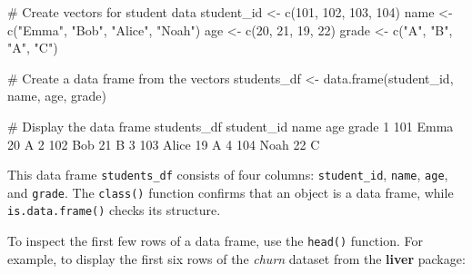\documentclass[
  11pt,
]{book}
\makeatletter
\newenvironment{Shaded}{}{}
\newcommand{\CommentTok}[1]{\textcolor[rgb]{0.36,0.36,0.36}{#1}}
\newcommand{\DecValTok}[1]{#1}
\newcommand{\FunctionTok}[1]{#1}
\newcommand{\NormalTok}[1]{#1}
\newcommand{\OtherTok}[1]{\textcolor[rgb]{0.39,0.39,0.39}{#1}}
\newcommand{\StringTok}[1]{\textcolor[rgb]{0.39,0.39,0.39}{#1}}
\newenvironment{kframe}{%
\medskip{}
\setlength{\fboxsep}{.8em}
 \def\at@end@of@kframe{}%
 \ifinner\ifhmode%
  \def\at@end@of@kframe{\end{minipage}}%
  \begin{minipage}{\columnwidth}%
 \fi\fi%
 \def\FrameCommand##1{\hskip\@totalleftmargin \hskip-\fboxsep
 \colorbox{shadecolor}{##1}\hskip-\fboxsep
     \hskip-\linewidth \hskip-\@totalleftmargin \hskip\columnwidth}%
 \MakeFramed {\advance\hsize-\width
   \@totalleftmargin\z@ \linewidth\hsize
   \@setminipage}}%
 {\par\unskip\endMakeFramed%
 \at@end@of@kframe}
\renewenvironment{Shaded}{\begin{kframe}}{\end{kframe}}
\theoremstyle{definition}
\theoremstyle{definition}
\theoremstyle{definition}
\theoremstyle{definition}
\theoremstyle{remark}
\makeatother
\begin{document}
\begin{Shaded}
\begin{Highlighting}[]
\CommentTok{\# Create vectors for student data}
\NormalTok{student\_id }\OtherTok{\textless{}{-}} \FunctionTok{c}\NormalTok{(}\DecValTok{101}\NormalTok{, }\DecValTok{102}\NormalTok{, }\DecValTok{103}\NormalTok{, }\DecValTok{104}\NormalTok{)}
\NormalTok{name       }\OtherTok{\textless{}{-}} \FunctionTok{c}\NormalTok{(}\StringTok{"Emma"}\NormalTok{, }\StringTok{"Bob"}\NormalTok{, }\StringTok{"Alice"}\NormalTok{, }\StringTok{"Noah"}\NormalTok{)}
\NormalTok{age        }\OtherTok{\textless{}{-}} \FunctionTok{c}\NormalTok{(}\DecValTok{20}\NormalTok{, }\DecValTok{21}\NormalTok{, }\DecValTok{19}\NormalTok{, }\DecValTok{22}\NormalTok{)}
\NormalTok{grade      }\OtherTok{\textless{}{-}} \FunctionTok{c}\NormalTok{(}\StringTok{"A"}\NormalTok{, }\StringTok{"B"}\NormalTok{, }\StringTok{"A"}\NormalTok{, }\StringTok{"C"}\NormalTok{)}

\CommentTok{\# Create a data frame from the vectors}
\NormalTok{students\_df }\OtherTok{\textless{}{-}} \FunctionTok{data.frame}\NormalTok{(student\_id, name, age, grade)}

\CommentTok{\# Display the data frame}
\NormalTok{students\_df}
\NormalTok{     student\_id  name age grade}
   \DecValTok{1}        \DecValTok{101}\NormalTok{  Emma  }\DecValTok{20}\NormalTok{     A}
   \DecValTok{2}        \DecValTok{102}\NormalTok{   Bob  }\DecValTok{21}\NormalTok{     B}
   \DecValTok{3}        \DecValTok{103}\NormalTok{ Alice  }\DecValTok{19}\NormalTok{     A}
   \DecValTok{4}        \DecValTok{104}\NormalTok{  Noah  }\DecValTok{22}\NormalTok{     C}
\end{Highlighting}
\end{Shaded}

This data frame \texttt{students\_df} consists of four columns: \texttt{student\_id}, \texttt{name}, \texttt{age}, and \texttt{grade}. The \texttt{class()} function confirms that an object is a data frame, while \texttt{is.data.frame()} checks its structure.

To inspect the first few rows of a data frame, use the \texttt{head()} function. For example, to display the first six rows of the \emph{churn} dataset from the \textbf{liver} package:
\end{document}
